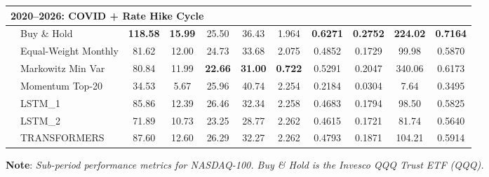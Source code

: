 \documentclass[]{elsarticle}
\begin{document}
\begin{table}[H]
{\begin{tabular}{llccccccccc}
\multicolumn{11}{l}{\textbf{2020--2026: COVID + Rate Hike Cycle}} \\
\midrule
& Buy \& Hold          & \textbf{118.58} & \textbf{15.99} & 25.50 & 36.43 & 1.964 & \textbf{0.6271}  & \textbf{0.2752}  & \textbf{224.02}   & \textbf{0.7164} \\
& Equal-Weight Monthly & 81.62  & 12.00 & 24.73 & 33.68 & 2.075 & 0.4852  & 0.1729  & 99.98    & 0.5870 \\
& Markowitz Min Var    & 80.84  & 11.99 & \textbf{22.66} & \textbf{31.00} & \textbf{0.722} & 0.5291  & 0.2047  & 340.06   & 0.6173 \\
& Momentum Top-20      & 34.53  & 5.67  & 25.96 & 40.74 & 2.254 & 0.2184  & 0.0304   & 7.64     & 0.3495 \\
& LSTM\_1              & 85.86  & 12.39 & 26.46 & 32.34 & 2.258 & 0.4683  & 0.1794  & 98.50    & 0.5825 \\
& LSTM\_2              & 71.89  & 10.73 & 23.25 & 28.77 & 2.262 & 0.4615  & 0.1721  & 81.74    & 0.5640 \\
& TRANSFORMERS         & 87.60  & 12.60 & 26.29 & 32.27 & 2.262 & 0.4793  & 0.1871  & 104.21   & 0.5914 \\

\bottomrule
\end{tabular}}
\end{table}

\vspace{-0.4cm}
\noindent\linespread{0.65}\selectfont
{\scriptsize \textbf{Note}: \textit{Sub-period performance metrics for NASDAQ-100. Buy \& Hold is the Invesco QQQ Trust ETF (QQQ).}}

\linespread{1.5}\selectfont
\end{document}
